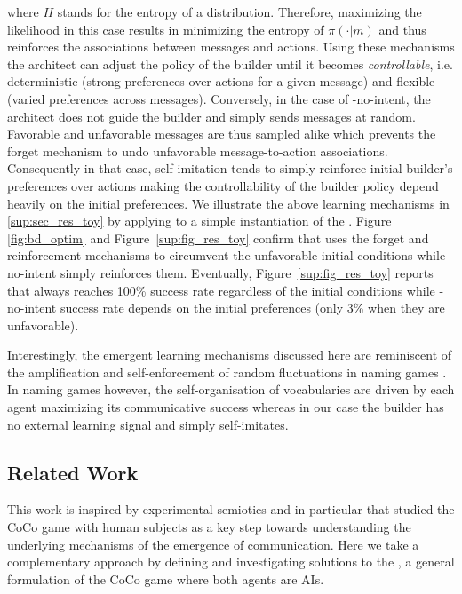 where $H$ stands for the entropy of a distribution. Therefore, maximizing the likelihood in this case results in minimizing the entropy of $\pi(\cdot|m)$ and thus reinforces the associations between messages and actions. Using these mechanisms the architect can adjust the policy of the builder until it becomes \emph{controllable}, i.e. deterministic (strong preferences over actions for a given message) and flexible (varied preferences across messages). Conversely, in the case of \abig-no-intent, the architect does not guide the builder and simply sends messages at random. Favorable and unfavorable messages are thus sampled alike which prevents the forget mechanism to undo unfavorable message-to-action associations. Consequently in that case, self-imitation tends to simply reinforce initial builder's preferences over actions making the controllability of the builder policy depend heavily on the initial preferences. We illustrate the above learning mechanisms in \ap\ref{sup:sec_res_toy} by applying \abig to a simple instantiation of the \abp. Figure \ref{fig:bd_optim} and Figure~\ref{sup:fig_res_toy} confirm that \abig uses the forget and reinforcement mechanisms to circumvent the unfavorable initial conditions while \abig-no-intent simply reinforces them. Eventually, Figure~\ref{sup:fig_res_toy} reports that \abig always reaches 100\% success rate regardless of the initial conditions while \abig-no-intent success rate depends on the initial preferences (only 3\% when they are unfavorable). 

Interestingly, the emergent learning mechanisms discussed here are reminiscent of the amplification and self-enforcement of random fluctuations in naming games \cite{steels1995self}. In naming games however, the self-organisation of vocabularies are driven by each agent maximizing its communicative success whereas in our case the builder has no external learning signal and simply self-imitates.

\subsection{Related Work}
This work is inspired by experimental semiotics \cite{galantucci2011experimental} and in particular \cite{vollmer2014studying} that studied the CoCo game with human subjects as a key step towards understanding the underlying mechanisms of the emergence of communication. Here we take a complementary approach by defining and investigating solutions to the \abp, a general formulation of the CoCo game where both agents are AIs. 

